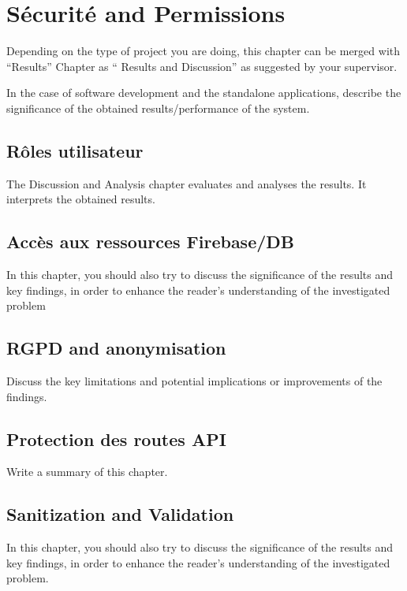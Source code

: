 \chapter{Sécurité and Permissions}
\label{ch:evaluation}

Depending on the type of project you are doing, this chapter can be merged with ``Results'' Chapter as `` Results and Discussion'' as suggested by your supervisor. 

In the case of software development and the standalone applications, describe the significance of the obtained results/performance of the system. 



\section{Rôles utilisateur}%
The Discussion and Analysis chapter evaluates and analyses the results. It interprets the obtained results. 



\section{Accès aux ressources Firebase/DB}
In this chapter, you should also try to discuss the significance of the results and key findings, in order to enhance the reader's understanding of the investigated problem

\section{RGPD and anonymisation} %
Discuss the key limitations and potential implications or improvements of the findings.
\section{Protection des routes API}
Write a summary of this chapter.

\section{Sanitization and Validation}
In this chapter, you should also try to discuss the significance of the results and key findings, in order to enhance the reader's understanding of the investigated problem.